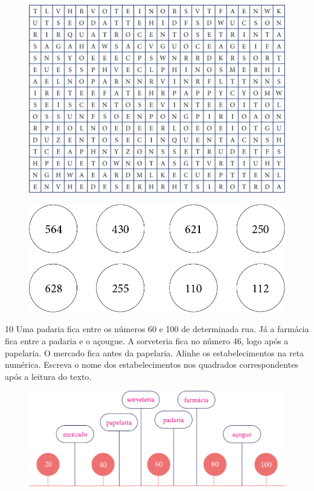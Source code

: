 \begin{figure}[htpb!]
\includegraphics[width=\textwidth]{./media/image11.png}
\end{figure}

\begin{figure}[htpb!]
\includegraphics[width=\textwidth]{./media/image12.png}
\end{figure}


\pagebreak
\num{10} Uma padaria fica entre os números 60 e 100 de determinada rua. Já a farmácia fica entre a padaria e o açougue. A sorveteria fica no número 46, logo após a papelaria. O mercado fica antes da papelaria.
Alinhe os estabelecimentos na reta numérica. Escreva o nome dos
estabelecimentos nos quadrados correspondentes após a leitura do texto.

\begin{figure}[htpb!]
\centering
\includegraphics[width=+1.09\textwidth]{./media/image14.png}
\end{figure}

